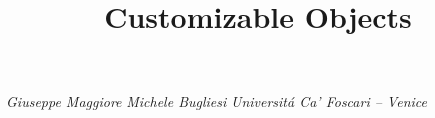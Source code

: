 \documentclass[a4paper]{article}
\begin{document}
\title{Customizable Objects}

\textit{Giuseppe Maggiore}
\textit{Michele Bugliesi}
\textit{Universitá Ca'  Foscari -- Venice}

 
 
 
 
 
 
 
 
 
\end{document}
